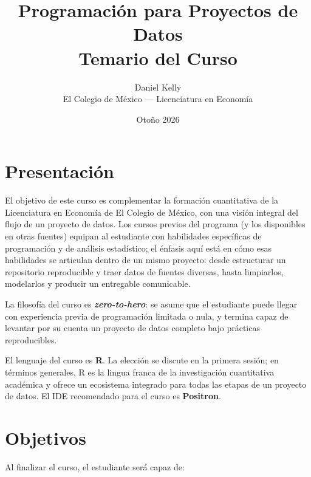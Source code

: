 \documentclass[11pt,letterpaper]{article}
\title{\color{main}\textbf{Programación para Proyectos de Datos}\\[0.3em]
       \large\color{subtitle}Temario del Curso}
\author{Daniel Kelly\\
        \small El Colegio de México --- Licenciatura en Economía}
\date{Otoño 2026}
\newcommand{\blue}[1]{{\color{cerulean}#1}}
\newcommand{\orange}[1]{{\color{redorange}#1}}
\begin{document}
\maketitle

\section{Presentación}

El objetivo de este curso es complementar la formación cuantitativa de la Licenciatura en Economía de El Colegio de México, con una visión integral del flujo de un proyecto de datos. Los cursos previos del programa (y los disponibles en otras fuentes) equipan al estudiante con \blue{habilidades específicas} de programación y de análisis estadístico; el énfasis aquí está en cómo esas habilidades se \orange{articulan dentro de un mismo proyecto}: desde estructurar un repositorio reproducible y traer datos de fuentes diversas, hasta limpiarlos, modelarlos y producir un entregable comunicable.

La filosofía del curso es \textbf{\textit{zero-to-hero}}: se asume que el estudiante puede llegar con experiencia previa de programación limitada o nula, y termina capaz de levantar por su cuenta un proyecto de datos completo bajo prácticas reproducibles.

El lenguaje del curso es \textbf{R}. La elección se discute en la primera sesión; en términos generales, R es la lingua franca de la investigación cuantitativa académica y ofrece un ecosistema integrado para todas las etapas de un proyecto de datos. El IDE recomendado para el curso es \textbf{Positron}.

\section{Objetivos}

Al finalizar el curso, el estudiante será capaz de:
\end{document}
